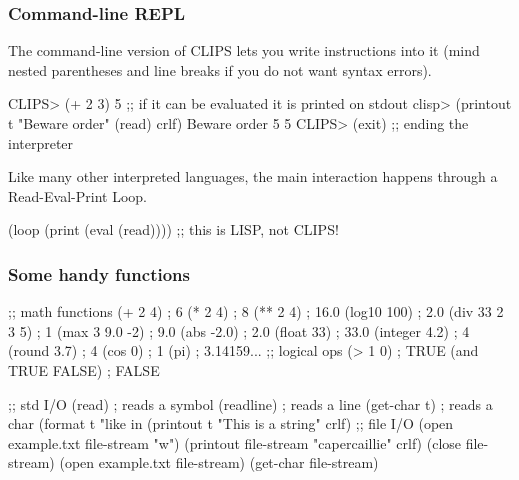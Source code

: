 \documentclass[xcolor={usenames,dvipsnames,svgnames}, compress]{beamer}
\begin{document}
\begin{frame}[fragile]
  \frametitle{Command-line REPL}
  
  The command-line version of CLIPS lets you write instructions into
  it (mind nested parentheses and line breaks if you do not want syntax errors).
  \begin{clips-code}[numbers=none]
    CLIPS> (+ 2 3)
    5 ;; if it can be evaluated it is printed on stdout
    clisp> (printout t "Beware order" (read) crlf)
    Beware order  5
    5
    CLIPS> (exit) ;; ending the interpreter
  \end{clips-code}\bigskip
  
  Like many other interpreted languages, the main interaction happens through a \textsf{R}ead-\textsf{E}val-\textsf{P}rint
  \textsf{L}oop.
  \begin{clips-code}[numbers=none]
    (loop (print (eval (read)))) ;; this is LISP, not CLIPS!
  \end{clips-code}
  
  
\end{frame}

\begin{frame}[fragile]
  \frametitle{Some handy functions}
  \begin{minipage}[t]{0.45\linewidth}
    \begin{clips-code}[numbers=none]
      ;; math functions
      (+ 2 4) ; 6
      (* 2 4) ; 8
      (** 2 4) ; 16.0
      (log10 100) ; 2.0
      (div 33 2 3 5) ; 1
      (max 3 9.0 -2) ; 9.0
      (abs -2.0) ; 2.0
      (float 33) ; 33.0
      (integer 4.2) ; 4
      (round 3.7) ; 4
      (cos 0) ; 1
      (pi) ; 3.14159...
      ;; logical ops
      (> 1 0) ; TRUE
      (and TRUE FALSE) ; FALSE
    \end{clips-code}
  \end{minipage}
  \begin{minipage}[t]{0.45\linewidth}
    \begin{clips-code}[numbers=none]
      ;; std I/O
      (read) ; reads a symbol
      (readline) ; reads a line
      (get-char t) ; reads a char
      (format t "like in %
      (printout t
          "This is a string" crlf)
      ;; file I/O
      (open example.txt
          file-stream "w")
      (printout file-stream
          "capercaillie" crlf)
      (close file-stream)
      (open example.txt
          file-stream)
      (get-char file-stream)
    \end{clips-code}
  \end{minipage}
\end{frame}
\end{document}
